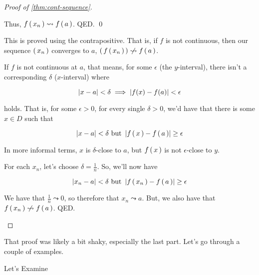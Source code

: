 \begin{proof}[Proof of \cref{thm:cont-sequence}]
\begin{description}
    Thus, $f \left(\, x_n \,\right) \leadsto f \left(\, a \,\right)$. QED. \qed
  \item[Proof of the ``if'' part] This is proved using the contrapositive. That
    is, if $f$ is not continuous, then our sequence $\left(\, x_n \,\right)$ converges to
    $a$,  $\mlist{\eva{f}{x_n}} \centernot\leadsto \eva{f}{a}$.

    If $f$ is not continuous at $a$, that means, for some $\epsilon$ (the
    $y$-interval), there isn't a corresponding $\delta$ ($x$-interval) where

    \begin{equation}
      \label{eq:contdef}
      \left| x - a \right| < \delta \implies \left| f(x) - f(a) \right| < \epsilon
    \end{equation}

    holds. That is, for some $\epsilon > 0$, for every single $\delta > 0$, we'd
    have that there is some $x \in D$ such that

    \begin{equation}
      \left| x - a \right| < \delta \text{ but } \left| f \left(\, x \,\right) - f \left(\, a \,\right) \right| \ge \epsilon
    \end{equation}

    In more informal terms, $x$ is $\delta$-close to $a$, but $f \left(\, x \,\right)$ is
    not $\epsilon$-close to $y$.

    For each $x_n$, let's choose $\delta = \frac{1}{n}$. So, we'll now have

    \begin{equation}
      \left| x_n - a \right| < \delta \text{ but } \left| f \left(\, x_n \,\right) - f \left(\, a \,\right) \right| \ge \epsilon
    \end{equation}

    We have that $\frac{1}{n} \leadsto 0$, so therefore that $x_n \leadsto a$.
    But, we also have that $\eva{f}{x_n} \centernot\leadsto \eva{f}{a}$. QED.
  \end{description}
\end{proof}

That proof was likely a bit shaky, especially the last part. Let's go through a
couple of examples.

\begin{example}
  Let's Examine
\end{example}